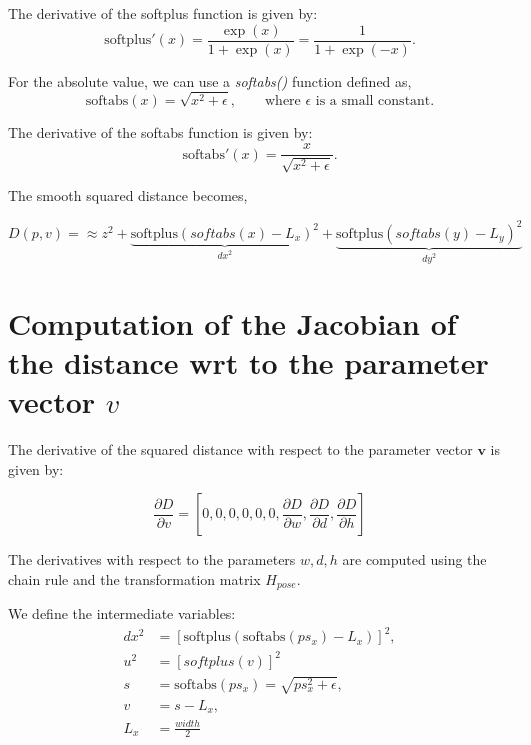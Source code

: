 \documentclass[11pt]{article}
\begin{document}
        The derivative of the softplus function is given by:
        \begin{equation}
            \text{softplus}'(x) = \frac{\exp(x)}{1+\exp(x)} = \frac{1}{1+\exp(-x)}.
        \end{equation}

        For the absolute value, we can use a \textit{softabs()} function defined as,
        \begin{equation}
            \text{softabs}(x) = \sqrt{x^2 + \epsilon}, \qquad \text{where } \epsilon \text{ is a small constant}.
        \end{equation}

        The derivative of the softabs function is given by:
        \begin{equation}
            \text{softabs}'(x) = \frac{x}{\sqrt{x^2 + \epsilon}}.
        \end{equation}


        The smooth squared distance becomes,

        \begin{equation}
            \boxed{D(p,v) = \approx z^2 + \underbrace{\text{softplus}(softabs(x) - L_x)^2}_{dx^2} + \underbrace{\text{softplus}(softabs(y) - L_y)^2}_{dy^2}}
        \end{equation}




\section*{Computation of the Jacobian of the distance wrt to the parameter vector $v$}

        The derivative of the squared distance with respect to the parameter vector \(\mathbf{v}\) is given by:

        \begin{equation}
            \frac{\partial D}{\partial v} = \left[0,0,0,0,0,0, \frac{\partial D}{\partial w}, \frac{\partial D}{\partial d}, \frac{\partial D}{\partial h}\right]
        \end{equation}

        The derivatives with respect to the parameters $w,d,h$ are computed using the chain rule and the transformation matrix \(H_{pose}\).

        We define the intermediate variables:
        \begin{align}
            dx^2 &= \left[\text{softplus}(\text{softabs}(ps_x) - L_x)\right]^2,\\
            u^2 &= [softplus(v)]^2 \\
            s &= \text{softabs}(ps_{x}) = \sqrt{ps_{x}^2 + \epsilon}, \\
            v &= s - L_x, \\
            L_x &= \frac{width}{2} \\
        \end{align}
\end{document}

